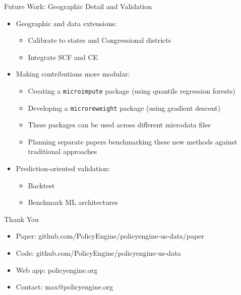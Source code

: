 \documentclass{beamer}
\begin{document}
\begin{frame}{Future Work: Geographic Detail and Validation}
    \begin{itemize}
        \item Geographic and data extensions:
        \begin{itemize}
            \item Calibrate to states and Congressional districts
            \item Integrate SCF and CE
        \end{itemize}
        \item Making contributions more modular:
        \begin{itemize}
            \item Creating a \texttt{microimpute} package (using quantile regression forests)
            \item Developing a \texttt{microreweight} package (using gradient descent)
            \item These packages can be used across different microdata files
            \item Planning separate papers benchmarking these new methods against traditional approaches
        \end{itemize}
        \item Prediction-oriented validation:
        \begin{itemize}
            \item Backtest
            \item Benchmark ML architectures
        \end{itemize}
    \end{itemize}
\end{frame}

\begin{frame}{Thank You}
    \begin{itemize}
        \item Paper: github.com/PolicyEngine/policyengine-us-data/paper
        \item Code: github.com/PolicyEngine/policyengine-us-data
        \item Web app: policyengine.org
        \item Contact: max@policyengine.org
    \end{itemize}
\end{frame}
\end{document}
